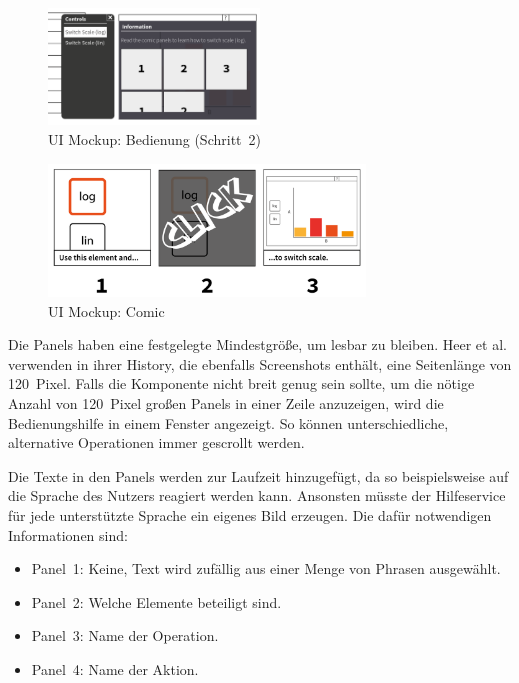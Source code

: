 \documentclass[
	headsepline,
	footsepline,
	fontsize=12pt,
	bibliography=totoc
]{scrbook}
\begin{document}
\begin{figure}[htbp]
   \centering
   \includegraphics[width=0.5\textwidth]{images/konzeption-bedienung-step2.png}
   \caption{UI Mockup: Bedienung (Schritt~2)}
   \label{figure:bedienung-step2}
\end{figure}

\begin{figure}[htbp]
   \centering
   \includegraphics[width=0.75\textwidth]{images/konzeption-bedienung-comic.png}
   \caption{UI Mockup: Comic}
   \label{figure:bedienung-comic}
\end{figure}

Die Panels haben eine festgelegte Mindestgröße, um lesbar zu bleiben. Heer et al. \cite{Heer2008} verwenden in ihrer History, die ebenfalls Screenshots enthält, eine Seitenlänge von 120~Pixel. Falls die Komponente nicht breit genug sein sollte, um die nötige Anzahl von 120~Pixel großen Panels in einer Zeile anzuzeigen, wird die Bedienungshilfe in einem Fenster angezeigt. So können unterschiedliche, alternative Operationen immer gescrollt werden.

Die Texte in den Panels werden zur Laufzeit hinzugefügt, da so beispielsweise auf die Sprache des Nutzers reagiert werden kann. Ansonsten müsste der Hilfeservice für jede unterstützte Sprache ein eigenes Bild erzeugen. Die dafür notwendigen Informationen sind:

\begin{itemize}
	\item Panel~1: Keine, Text wird zufällig aus einer Menge von Phrasen ausgewählt.
	\item Panel~2: Welche Elemente beteiligt sind.
	\item Panel~3: Name der Operation.
	\item Panel~4: Name der Aktion.
\end{itemize}
\end{document}
